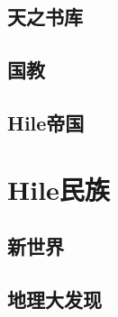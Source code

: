\documentclass[UTF8,12pt]{ctexbook}
\begin{document}
    \chapter{天之书库}

    \chapter{国教}

    \chapter{Hile帝国}

\part{Hile民族}
    \chapter{新世界}
    
    \chapter{地理大发现}
\end{document}

